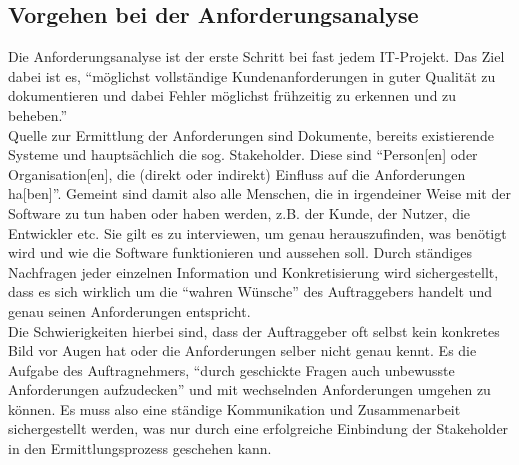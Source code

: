 \documentclass [12pt, a4paper, oneside, titlepage, ngerman]{article}
\begin{document}
\subsection{Vorgehen bei der Anforderungsanalyse}
Die Anforderungsanalyse ist der erste Schritt bei fast jedem IT-Projekt. Das Ziel dabei ist es, "`möglichst vollständige Kundenanforderungen in guter Qualität zu dokumentieren und dabei Fehler möglichst frühzeitig zu erkennen und zu beheben."' \cite[S.11]{PohlRupp2015} \\
Quelle zur Ermittlung der Anforderungen sind Dokumente, bereits existierende Systeme und hauptsächlich die sog. Stakeholder. Diese sind "`Person[en] oder Organisation[en], die (direkt oder indirekt) Einfluss auf die Anforderungen ha[ben]"'\cite[S.21]{PohlRupp2015}. Gemeint sind damit also alle Menschen, die in irgendeiner Weise mit der Software zu tun haben oder haben werden, z.B. der Kunde, der Nutzer, die Entwickler etc. Sie gilt es zu interviewen, um genau herauszufinden, was benötigt wird und wie die Software funktionieren und aussehen soll. Durch ständiges Nachfragen jeder einzelnen Information und Konkretisierung wird sichergestellt, dass es sich wirklich um die "`wahren Wünsche"' %
 des Auftraggebers handelt und genau seinen Anforderungen entspricht.  \\
Die Schwierigkeiten hierbei sind, dass der Auftraggeber oft selbst kein konkretes Bild vor Augen hat oder die Anforderungen selber nicht genau kennt. Es die Aufgabe des Auftragnehmers, "`durch geschickte Fragen auch unbewusste Anforderungen aufzudecken"'\cite[S.28]{PohlRupp2015} und mit wechselnden Anforderungen umgehen zu können.
Es muss also eine ständige Kommunikation und Zusammenarbeit sichergestellt werden, was nur durch eine erfolgreiche Einbindung der Stakeholder in den Ermittlungsprozess geschehen kann\cite[vgl. S. 33-34]{PohlRupp2015}.
\end{document}
